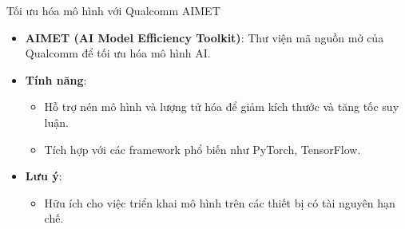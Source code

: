 \documentclass{beamer}
\begin{document}
\begin{frame}{Tối ưu hóa mô hình với Qualcomm AIMET}
    \begin{itemize}
        \item \textbf{AIMET (AI Model Efficiency Toolkit)}: Thư viện mã nguồn mở của Qualcomm để tối ưu hóa mô hình AI.
        \item \textbf{Tính năng}:
        \begin{itemize}
            \item Hỗ trợ nén mô hình và lượng tử hóa để giảm kích thước và tăng tốc suy luận.
            \item Tích hợp với các framework phổ biến như PyTorch, TensorFlow.
        \end{itemize}
        \item \textbf{Lưu ý}:
        \begin{itemize}
            \item Hữu ích cho việc triển khai mô hình trên các thiết bị có tài nguyên hạn chế.
        \end{itemize}
    \end{itemize}
\end{frame}


    

    
\end{document}
